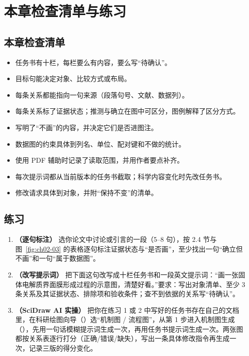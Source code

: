 \section{本章检查清单与练习}

\subsection*{本章检查清单}

\begin{itemize}
\item 任务书有十栏，每栏要么有内容，要么写“待确认”。
\item 目标句能决定对象、比较方式或布局。
\item 每条关系都能指向一句来源（段落句号、文献、数据列）。
\item 每条关系标了证据状态；推测与确立在图中可区分，图例解释了区分方式。
\item 写明了“不画”的内容，并决定它们是否进图注。
\item 数据图的约束具体到列名、单位、配对键和不做的统计。
\item 使用 PDF 辅助时记录了读取范围，并用作者要点补齐。
\item 每次提示词都从当前版本的任务书截取；科学内容变化时先改任务书。
\item 修改请求具体到对象，并附“保持不变”的清单。
\end{itemize}

\subsection*{练习}

\begin{enumerate}
\item \textbf{（逐句标注）} 选你论文中讨论或引言的一段（5–8 句），按 2.4 节与图~\ref{fig:ch02-03} 的表格逐句标注证据状态与“是否画”，至少找出一句“确立但不画”和一句“属于数据图”。
\item \textbf{（改写提示词）} 把下面这句改写成十栏任务书和一段英文提示词：“画一张固体电解质界面膜形成过程的示意图，清楚好看。”要求：写出对象清单、至少 3 条关系及其证据状态、排除项和验收条件；查不到依据的关系写“待确认”。
\item \textbf{（SciDraw AI 实操）} 把你在练习 1 或 2 中写好的任务书存在自己的文档里，在科研绘图向导（）选“机制图 / 流程图”，从第 1 步进入机制图生成（），先用一句话模糊提示词生成一次，再用任务书提示词生成一次。两张图都按关系表逐行打分（正确/错误/缺失），写出一条具体修改指令再生成一次，记录三版的得分变化。
\end{enumerate}

